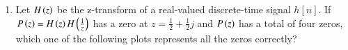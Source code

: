 \documentclass[a4paper, 11pt]{article}
\begin{document}
\begin{enumerate}
    \item Let $H\left(z\right)$ be the z-transform of a real-valued discrete-time signal $h[n]$. If $P\left(z\right)=H\left(z\right)H\left(\frac{1}{z}\right)$ has a zero at $z=\frac{1}{2}+\frac{1}{2}j$ and $P\left(z\right)$ has a total of four zeros, which one of the following plots represents all the zeros correctly?
    \begin{enumerate}
\end{enumerate}
\end{enumerate}
\end{document}
